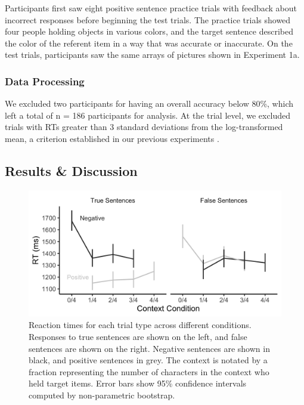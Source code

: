 \documentclass[man, floatsintext, noapacite]{apa6}
\begin{document}
Participants first saw eight positive sentence practice trials with feedback about incorrect responses before beginning the test trials. The practice trials showed four people holding objects in various colors, and the target sentence described the color of the referent item in a way that was accurate or inaccurate. On the test trials, participants saw the same arrays of pictures shown in Experiment 1a. 

\subsubsection{Data Processing} 

We excluded two participants for having an overall accuracy below 80\%, which left a total of n = 186 participants for analysis. At the trial level, we excluded trials with RTs greater than 3 standard deviations from the log-transformed mean, a criterion established in our previous experiments \cite{nordmeyer2014}. 

\subsection{Results \& Discussion}

\begin{figure}[t]
\begin{center} 
\includegraphics[width=6in]{figures/experiment1/listener_rts.png}
\caption{\label{fig:exp1_listenerrt} Reaction times for each trial type across different conditions. Responses to true sentences are shown on the left, and false sentences are shown on the right.  Negative sentences are shown in black, and positive sentences in grey.  The context is notated by a fraction representing the number of characters in the context who held target items. Error bars show 95\% confidence intervals computed by non-parametric bootstrap.}
\end{center} 
\end{figure}
\end{document}
